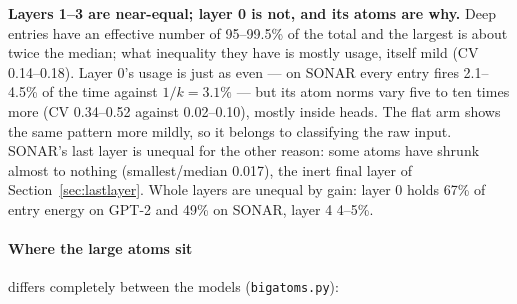\textbf{Layers 1--3 are near-equal; layer 0 is not, and its atoms are
why.} Deep entries have an effective number of 95--99.5\% of the total
and the largest is about twice the median; what inequality they have is
mostly usage, itself mild (CV 0.14--0.18). Layer 0's usage is just as
even --- on SONAR every entry fires 2.1--4.5\% of the time against $1/k =
3.1\%$ --- but its atom norms vary five to ten times more (CV 0.34--0.52
against 0.02--0.10), mostly inside heads. The flat arm shows the same
pattern more mildly, so it belongs to classifying the raw input. SONAR's
last layer is unequal for the other reason: some atoms have shrunk almost
to nothing (smallest/median 0.017), the inert final layer of
Section~\ref{sec:lastlayer}. Whole layers are unequal by gain: layer 0
holds 67\% of entry energy on GPT-2 and 49\% on SONAR, layer 4 4--5\%.

\paragraph{Where the large atoms sit} differs completely between the
models (\texttt{bigatoms.py}):

